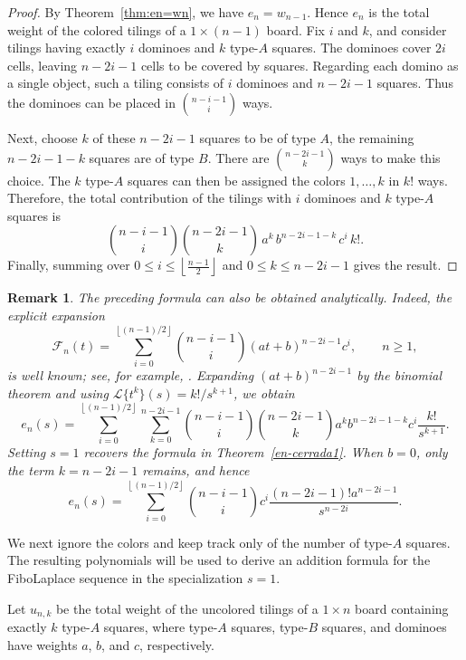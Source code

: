 \documentclass[11pt]{amsart}
\newcommand{\Ft}[1]{\mathscr{F}_{#1}}
\theoremstyle{plain}
\numberwithin{equation}{section}
\newtheorem{remark}{Remark}
\begin{document}
\begin{proof}
By Theorem~\ref{thm:en=wn}, we have $e_n=w_{n-1}$. Hence $e_n$ is
the total weight of the colored tilings of a $1\times(n-1)$ board. Fix $i$ and $k$, and consider tilings having exactly $i$ dominoes and
$k$ type-$A$ squares. The dominoes cover $2i$ cells, leaving
$n-2i-1$ cells to be covered by squares. Regarding each domino as a
single object, such a tiling consists of $i$ dominoes and
$n-2i-1$ squares. Thus the dominoes can be placed in $\binom{n-i-1}{i}$ ways.


Next, choose  $k$ of these $n-2i-1$ squares to be of type $A$, the
remaining $n-2i-1-k$ squares are of type $B$. There are $\binom{n-2i-1}{k}$ ways to make this choice.  The $k$ type-$A$ squares can then be assigned the colors $1,\ldots,k$ in $k!$ ways. Therefore, the total contribution of the tilings with $i$ dominoes
and $k$ type-$A$ squares is 
\[
\binom{n-i-1}{i}\binom{n-2i-1}{k}\,a^{k}\,b^{n-2i-1-k}\,c^{i}\,k!.
\]
Finally, summing over  $0\leq i\leq \left\lfloor\frac{n-1}{2}\right\rfloor$ and $0\leq k\leq n-2i-1$ gives the result.
\end{proof}


\begin{remark}
The preceding formula can also be obtained analytically. Indeed, the explicit expansion
\begin{equation*}
\Ft{n}(t)
=
\sum_{i=0}^{\left\lfloor (n-1)/2\right\rfloor}
\binom{n-i-1}{i}(at+b)^{n-2i-1}c^i,
\qquad n\geq 1,
\end{equation*}
is well known; see, for example, \cite{FlorezJC}. Expanding
$(at+b)^{n-2i-1}$ by the binomial theorem and using $
\mathcal{L}\{t^k\}(s)=k!/s^{k+1}$,  we obtain
\[
e_n(s)
=
\sum_{i=0}^{\left\lfloor (n-1)/2\right\rfloor}
\sum_{k=0}^{n-2i-1}
\binom{n-i-1}{i}
\binom{n-2i-1}{k}
a^k b^{n-2i-1-k}c^i
\frac{k!}{s^{k+1}}.
\]
Setting $s=1$ recovers the formula in
Theorem~\ref{en-cerrada1}. When $b=0$, only the term $k=n-2i-1$ remains, and hence
\begin{equation*}
e_n(s)
=
\sum_{i=0}^{\left\lfloor (n-1)/2\right\rfloor}
\binom{n-i-1}{i}
c^i
\frac{(n-2i-1)!a^{n-2i-1}}{s^{n-2i}}.
\end{equation*}
\end{remark}

We next ignore the colors and keep track only of the number of type-$A$ squares. The resulting polynomials will be used to derive an addition formula for the FiboLaplace sequence in the specialization $s=1$.

Let $u_{n,k}$ be the total weight of the uncolored tilings of a
$1\times n$ board containing exactly $k$ type-$A$ squares, where
type-$A$ squares, type-$B$ squares, and dominoes have weights $a$,
$b$, and $c$, respectively.
\end{document}
